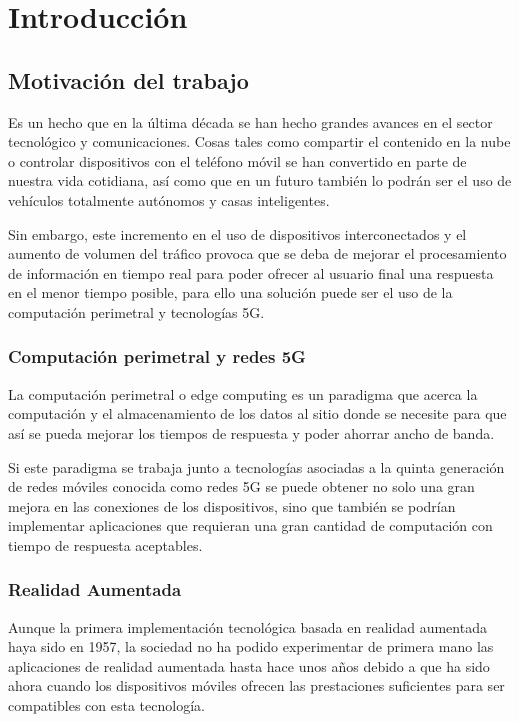 \chapter{Introducción}

\section{Motivación del trabajo}
Es un hecho que en la última década se han hecho grandes avances en el sector tecnológico y comunicaciones. Cosas tales como compartir el contenido en la nube o controlar dispositivos con el teléfono móvil se han convertido en parte de nuestra vida cotidiana, así como que en un futuro también lo podrán ser el uso de vehículos totalmente autónomos y casas inteligentes.

Sin embargo, este incremento en el uso de dispositivos interconectados y el aumento de volumen del tráfico provoca que se deba de mejorar el procesamiento de información en tiempo real para poder ofrecer al usuario final una respuesta en el menor tiempo posible, para ello una solución puede ser el uso de la computación perimetral y tecnologías 5G.

\subsection{Computación perimetral y redes 5G}
La computación perimetral o edge computing es un paradigma que acerca la computación y el almacenamiento de los datos al sitio donde se necesite para que así se pueda mejorar los tiempos de respuesta y poder ahorrar ancho de banda.

Si este paradigma se trabaja junto a tecnologías asociadas a la quinta generación de redes móviles conocida como redes 5G se puede obtener no solo una gran mejora en las conexiones de los dispositivos, sino que también se podrían implementar aplicaciones que requieran una gran cantidad de computación con tiempo de respuesta aceptables.

\subsection{Realidad Aumentada}
Aunque la primera implementación tecnológica basada en realidad aumentada haya sido en 1957, la sociedad no ha podido experimentar de primera mano las aplicaciones de realidad aumentada hasta hace unos años debido a que ha sido ahora cuando los dispositivos móviles ofrecen las prestaciones suficientes para ser compatibles con esta tecnología.

